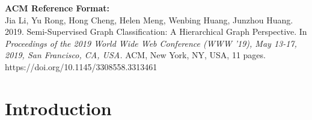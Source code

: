 \documentclass[sigconf]{acmart}
\begin{document}





\maketitle


{\fontsize{8pt}{8pt} \selectfont
\textbf{ACM Reference Format:}\\
Jia Li, Yu Rong, Hong Cheng, Helen Meng, Wenbing Huang, Junzhou Huang. 2019. Semi-Supervised Graph Classification: A Hierarchical Graph Perspective. In \textit{ Proceedings of the 2019 World Wide Web Conference (WWW '19), May 13-17, 2019, San Francisco, CA, USA. } ACM, New York, NY, USA, 11 pages. https://doi.org/10.1145/3308558.3313461 }


\section{Introduction}
\end{document}

